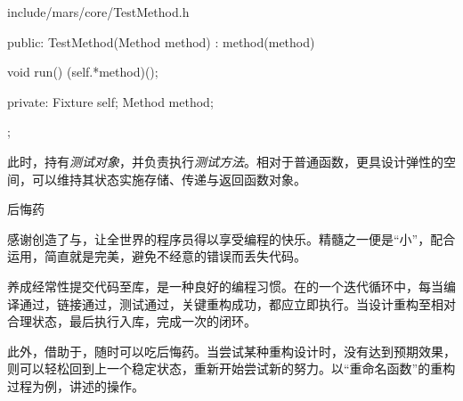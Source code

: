 \begin{content}
\begin{diff}{include/mars/core/TestMethod.h}
\begin{minicpp}
{public:
  TestMethod(Method method)
    : method(method) {
  }

  void run() {
    (self.*method)();
  }

private:
  Fixture self;
  Method method;
};
\end{minicpp}
\end{diff}

此时，持有\emph{测试对象}，并负责执行\emph{测试方法}。相对于普通函数，更具设计弹性的空间，可以维持其状态实施存储、传递与返回函数对象。

\begin{episode}{后悔药}

\begin{content}

感谢创造了与，让全世界的程序员得以享受编程的快乐。精髓之一便是“小”，配合运用，简直就是完美，避免不经意的错误而丢失代码。

养成经常性提交代码至库，是一种良好的编程习惯。在的一个迭代循环中，每当编译通过，链接通过，测试通过，关键重构成功，都应立即执行。当设计重构至相对合理状态，最后执行入库，完成一次的闭环。

此外，借助于，随时可以吃后悔药。当尝试某种重构设计时，没有达到预期效果，则可以轻松回到上一个稳定状态，重新开始尝试新的努力。以“重命名函数”的重构过程为例，讲述的操作。

\begin{enum}
\end{enum}

\end{content}
\end{episode}




\end{content}
